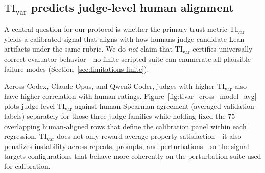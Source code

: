 \documentclass{article}
\begin{document}
\subsection{\texorpdfstring{\(\mathrm{TI}_{\mathrm{var}}\)}{TI-var} predicts judge-level human alignment}
\label{sec:tivar_cross_model_results}
\label{sec:validation-human-alignment}

A central question for our protocol is whether the primary trust metric \(\mathrm{TI}_{\mathrm{var}}\) yields a calibrated signal that aligns with how humans judge candidate Lean artifacts under the same rubric. We do \emph{not} claim that \(\mathrm{TI}_{\mathrm{var}}\) certifies universally correct evaluator behavior---no finite scripted suite can enumerate all plausible failure modes (Section~\ref{sec:limitations-finite}).

Across Codex, Claude Opus, and Qwen3-Coder, judges with higher \(\mathrm{TI}_{\mathrm{var}}\) also have higher correlation with human ratings. Figure~\ref{fig:tivar_cross_model_avg} plots judge-level \(\mathrm{TI}_{\mathrm{var}}\) against human Spearman agreement (averaged validation labels) separately for those three judge families while holding fixed the \(75\) overlapping human-aligned rows that define the calibration panel within each regression. \(\mathrm{TI}_{\mathrm{var}}\) does not only reward average property satisfaction---it also penalizes instability across repeats, prompts, and perturbations---so the signal targets configurations that behave more coherently on the perturbation suite used for calibration.
\end{document}
